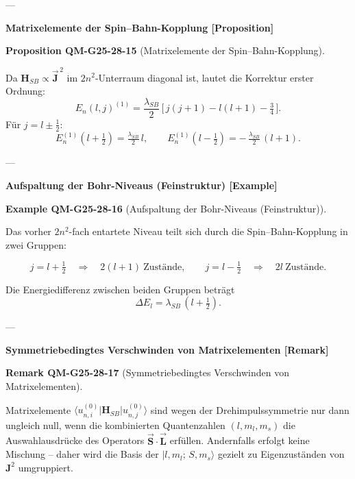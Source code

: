 \documentclass[10pt, letterpaper]{article}
\newcommand{\CustomHeading}[3]{%
  \par\medskip\noindent%
  \textbf{#1 #2} \textnormal{(#3)}.\enskip%
}
\newenvironment{PROP}[2]{\begin{unitbox}\CustomHeading{Proposition}{#1}{#2}}{\end{unitbox}}
\newenvironment{REM}[2]{\begin{unitbox}\CustomHeading{Remark}{#1}{#2}}{\end{unitbox}}
\newenvironment{EXA}[2]{\begin{unitbox}\CustomHeading{Example}{#1}{#2}}{\end{unitbox}}
\begin{document}
---

\textbf{Matrixelemente der Spin–Bahn-Kopplung [Proposition]}

\begin{PROP}{QM-G25-28-15}{Matrixelemente der Spin–Bahn-Kopplung}
Da $\mathbf{H}_{SB}\propto\vec{\mathbf J}^{\,2}$ im $2n^{2}$-Unterraum diagonal ist, lautet die Korrektur erster Ordnung:
\[
E_{n}(l,j)^{(1)} = 
\frac{\lambda_{SB}}{2}\,
\bigl[\,j(j+1)-l(l+1)-\tfrac34\,\bigr].
\]
Für $j=l\pm\tfrac12$:
\[
E_n^{(1)}(l+\tfrac12) = \tfrac{\lambda_{SB}}{2}\,l,\qquad
E_n^{(1)}(l-\tfrac12) = -\,\tfrac{\lambda_{SB}}{2}\,(l+1).
\]
\end{PROP}

---

\textbf{Aufspaltung der Bohr-Niveaus (Feinstruktur) [Example]}

\begin{EXA}{QM-G25-28-16}{Aufspaltung der Bohr-Niveaus (Feinstruktur)}
Das vorher $2n^{2}$-fach entartete Niveau teilt sich durch die Spin–Bahn-Kopplung in zwei Gruppen:

\[
\boxed{j = l+\tfrac12} \quad\Longrightarrow\quad 2(l+1)\ \text{Zustände},
\qquad
\boxed{j = l-\tfrac12} \quad\Longrightarrow\quad 2l\ \text{Zustände}.
\]

Die Energiedifferenz zwischen beiden Gruppen beträgt
\[
\Delta E_{l} = \lambda_{SB}\,(l+\tfrac12).
\]
\end{EXA}

---

\textbf{Symmetriebedingtes Verschwinden von Matrixelementen [Remark]}

\begin{REM}{QM-G25-28-17}{Symmetriebedingtes Verschwinden von Matrixelementen}
Matrixelemente $\langle u_{n,i}^{(0)}|\mathbf{H}_{SB}|u_{n,j}^{(0)}\rangle$ sind wegen der Drehimpulssymmetrie nur dann ungleich null, wenn die kombinierten Quantenzahlen $(l,m_l,m_s)$ die Auswahlausdrücke des Operators $\vec{\mathbf S}\!\cdot\!\vec{\mathbf L}$ erfüllen.  Andernfalls erfolgt keine Mischung – daher wird die Basis der $|l,m_l;\,S,m_s\rangle$ gezielt zu Eigenzuständen von $\mathbf{J}^{2}$ umgruppiert.
\end{REM}



\end{document}
